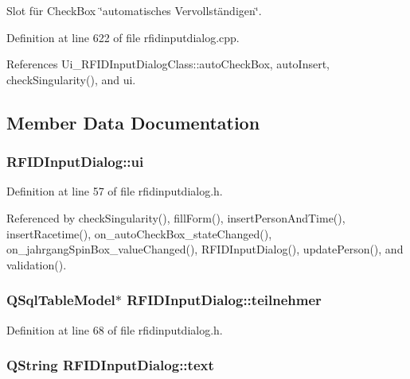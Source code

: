 Slot für CheckBox \char`\"{}automatisches Vervollständigen\char`\"{}. 



Definition at line 622 of file rfidinputdialog.cpp.

References Ui\_\-RFIDInputDialogClass::autoCheckBox, autoInsert, checkSingularity(), and ui.

\subsection{Member Data Documentation}
\hypertarget{class_r_f_i_d_input_dialog_e717744327dda404390c6be01b77180a}{
\subsubsection[ui]{ {\bf RFIDInputDialog::ui}}}
\label{class_r_f_i_d_input_dialog_e717744327dda404390c6be01b77180a}




Definition at line 57 of file rfidinputdialog.h.

Referenced by checkSingularity(), fillForm(), insertPersonAndTime(), insertRacetime(), on\_\-autoCheckBox\_\-stateChanged(), on\_\-jahrgangSpinBox\_\-valueChanged(), RFIDInputDialog(), updatePerson(), and validation().\hypertarget{class_r_f_i_d_input_dialog_23e23da528d95589aec6670ef8b0b067}{
\subsubsection[teilnehmer]{\setlength{\rightskip}{0pt plus 5cm}QSqlTableModel$\ast$ {\bf RFIDInputDialog::teilnehmer}}}
\label{class_r_f_i_d_input_dialog_23e23da528d95589aec6670ef8b0b067}




Definition at line 68 of file rfidinputdialog.h.\hypertarget{class_r_f_i_d_input_dialog_58508d18fe39d28748cbaea39b24d50b}{
\subsubsection[text]{\setlength{\rightskip}{0pt plus 5cm}QString {\bf RFIDInputDialog::text}}}
\label{class_r_f_i_d_input_dialog_58508d18fe39d28748cbaea39b24d50b}




